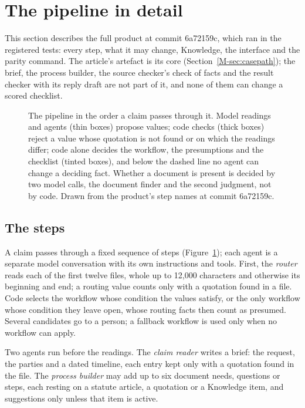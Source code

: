 \section{The pipeline in detail}
\label{supp:pipeline}

This section describes the full product at commit 6a72159c, which ran in the registered tests: every step, what it may change, Knowledge, the interface and the parity command. The article's artefact is its core (Section~\ref{M-sec:casepath}); the brief, the process builder, the source checker's check of facts and the result checker with its reply draft are not part of it, and none of them can change a scored checklist.

\begin{figure}[h]
\centering
{}
\caption{The \casepath pipeline in the order a claim passes through it. Model readings and agents (thin boxes) propose values; code checks (thick boxes) reject a value whose quotation is not found or on which the readings differ; code alone decides the workflow, the presumptions and the checklist (tinted boxes), and below the dashed line no agent can change a deciding fact. Whether a document is present is decided by two model calls, the document finder and the second judgment, not by code. Drawn from the product's step names at commit 6a72159c.}
\label{fig:pipeline}
\end{figure}

\subsection{The steps}
A claim passes through a fixed sequence of steps (Figure~\ref{fig:pipeline}); each agent is a separate model conversation with its own instructions and tools. First, the \emph{router} reads each of the first twelve files, whole up to 12,000 characters and otherwise its beginning and end; a routing value counts only with a quotation found in a file. Code selects the workflow whose condition the values satisfy, or the only workflow whose condition they leave open, whose routing facts then count as presumed. Several candidates go to a person; a fallback workflow is used only when no workflow can apply.

Two agents run before the readings. The \emph{claim reader} writes a brief: the request, the parties and a dated timeline, each entry kept only with a quotation found in the file. The \emph{process builder} may add up to six document needs, questions or steps, each resting on a statute article, a quotation or a Knowledge item, and suggestions only unless that item is active.

